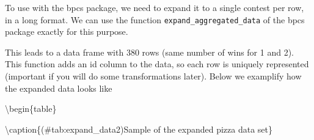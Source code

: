 \documentclass[
]{book}
\newenvironment{Shaded}{\begin{snugshade}}{\end{snugshade}}
\newcommand{\CommentTok}[1]{\textcolor[rgb]{0.56,0.35,0.01}{\textit{#1}}}
\newcommand{\DataTypeTok}[1]{\textcolor[rgb]{0.13,0.29,0.53}{#1}}
\newcommand{\DecValTok}[1]{\textcolor[rgb]{0.00,0.00,0.81}{#1}}
\newcommand{\KeywordTok}[1]{\textcolor[rgb]{0.13,0.29,0.53}{\textbf{#1}}}
\newcommand{\NormalTok}[1]{#1}
\newcommand{\OperatorTok}[1]{\textcolor[rgb]{0.81,0.36,0.00}{\textbf{#1}}}
\newcommand{\OtherTok}[1]{\textcolor[rgb]{0.56,0.35,0.01}{#1}}
\newcommand{\StringTok}[1]{\textcolor[rgb]{0.31,0.60,0.02}{#1}}
\begin{document}
To use with the bpcs package, we need to expand it to a single contest per row, in a long format. We can use the function \texttt{expand\_aggregated\_data} of the bpcs package exactly for this purpose.

This leads to a data frame with 380 rows (same number of wins for 1 and 2). This function adds an id column to the data, so each row is uniquely represented (important if you will do some transformations later). Below we examplify how the expanded data looks like

\begin{Shaded}
\end{Shaded}

\textbackslash begin\{table\}

\textbackslash caption\{(\#tab:expand\_data2)Sample of the expanded pizza data set\}
\centering
\end{document}
